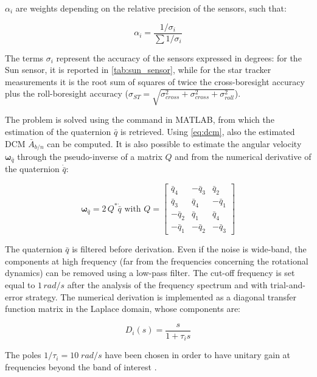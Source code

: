 $\alpha_i$ are weights depending on the relative precision of the sensors, such that:

\begin{equation}
    \alpha_i = \frac{1/\sigma_i}{\sum 1/ \sigma_i}
\end{equation}

The terms $\sigma_i$ represent the accuracy of the sensors expressed in degrees: for the Sun sensor, it is reported in \cref{tab:sun_sensor}, while for the star tracker measurements it is the root sum of squares of twice the cross-boresight accuracy plus the roll-boresight accuracy ($\sigma_{ST} = \sqrt{\sigma_{cross}^2 + \sigma_{cross}^2 + \sigma_{roll}^2}$).

The problem is solved using the command  in MATLAB, from which the estimation of the quaternion $\bar{q}$ is retrieved. Using \cref{eq:dcm}, also the estimated DCM $\bar{A}_{b/n}$ can be computed. It is also possible to estimate the angular velocity $\bm{\omega}_{\bar{q}}$ through the pseudo-inverse of a matrix $Q$ and from the numerical derivative of the quaternion $\dot{\bar{q}}$:

\begin{equation}
    \bm{\omega}_{\bar{q}} = 2\, Q^* \dot{\bar{q}} \text{ with  } Q = 
    \begin{bmatrix}
    \bar{q}_4 & - \bar{q}_3 & \bar{q}_2 \\
    \bar{q}_3 & \bar{q}_4 & -\bar{q}_1 \\
    -\bar{q}_2 & \bar{q}_1 & \bar{q}_4 \\
    -\bar{q}_1 & -\bar{q}_2 & -\bar{q}_3
    \end{bmatrix}
\end{equation}

The quaternion $\bar{q}$ is filtered before derivation. Even if the noise is wide-band, the components at high frequency (far from the frequencies concerning the rotational dynamics) can be removed using a low-pass filter. The cut-off frequency is set equal to $1\,rad/s$ after the analysis of the frequency spectrum and with trial-and-error strategy. The numerical derivation is implemented as a diagonal transfer function matrix in the Laplace domain, whose components are:

\begin{equation}
    D_i (s) = \frac{s}{1 + \tau_i s}
\end{equation}

The poles $1/\tau_i = 10 \; rad/s$ have been chosen in order to have unitary gain at frequencies beyond the band of interest \cite{dozio}.

